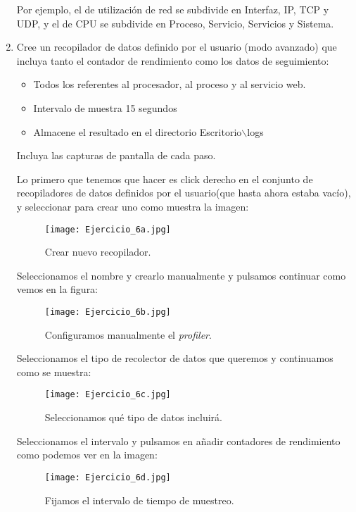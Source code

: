 \documentclass[paper=a4, fontsize=11pt]{scrartcl} %
\numberwithin{equation}{section} %
\numberwithin{figure}{section} %
\numberwithin{table}{section} %
\begin{document}
\begin{enumerate}
		Por ejemplo, el de utilización de red se subdivide en Interfaz, IP, TCP y UDP, y el de CPU se
		subdivide en Proceso, Servicio, Servicios y Sistema.
		
		\item Cree un recopilador de datos definido por el usuario (modo avanzado) que incluya tanto
		el contador de rendimiento como los datos de seguimiento:
		\begin{itemize}
			\item Todos los referentes al procesador, al proceso y al servicio web.
			\item Intervalo de muestra 15 segundos
			\item Almacene el resultado en el directorio Escritorio$\backslash$logs
		\end{itemize}
		Incluya las capturas de pantalla de cada paso.
		
		Lo primero que tenemos que hacer es click derecho en el conjunto de recopiladores de datos
		definidos por el usuario(que hasta ahora estaba vacío), y seleccionar para crear uno como
		muestra la imagen:
		
		\begin{figure}[H]
			\centering
			\texttt{[image: Ejercicio\_6a.jpg]}
			\caption{Crear nuevo recopilador.}
			\label{fig:SP_new}
		\end{figure}
		
		Seleccionamos el nombre y crearlo manualmente y pulsamos continuar como vemos en la figura:
		
		\begin{figure}[H]
			\centering
			\texttt{[image: Ejercicio\_6b.jpg]}
			\caption{Configuramos manualmente el \textit{profiler}.}
			\label{fig:SP_name}
		\end{figure}
		
		Seleccionamos el tipo de recolector de datos que queremos y continuamos como se muestra:
		
		\begin{figure}[H]
			\centering
			\texttt{[image: Ejercicio\_6c.jpg]}
			\caption{Seleccionamos qué tipo de datos incluirá.}
			\label{fig:SP_log}
		\end{figure}
		
		Seleccionamos el intervalo y pulsamos en añadir contadores de rendimiento como podemos ver en la
		imagen:
		
		\begin{figure}[H]
			\centering
			\texttt{[image: Ejercicio\_6d.jpg]}
			\caption{Fijamos el intervalo de tiempo de muestreo.}
			\label{fig:SP_time}
		\end{figure}
		

\end{enumerate}
\end{document}

